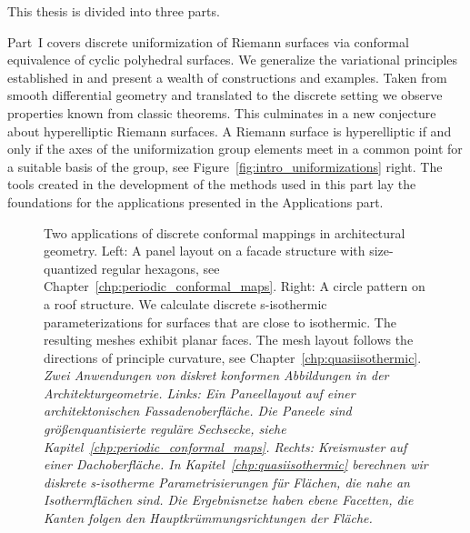 \documentclass[Thesis.tex]{subfiles}
\begin{document}
This thesis is divided into three parts. 

Part~I covers discrete uniformization of Riemann surfaces via conformal equivalence of cyclic polyhedral surfaces.
We generalize the variational principles established in \cite{Bobenko2010} and present a wealth of constructions and examples. 
Taken from smooth differential geometry and translated to the discrete setting we observe properties known from classic theorems. 
This culminates in a new conjecture about hyperelliptic Riemann surfaces. 
A Riemann surface is hyperelliptic if and only if the axes of the uniformization group elements meet in a common point for a suitable basis of the group, see Figure~\ref{fig:intro_uniformizations} right.
The tools created in the development of the methods used in this part lay the foundations for the applications presented in the Applications part.

\begin{figure}
\centering
{}
\caption{
Two applications of discrete conformal mappings in architectural geometry. 
Left: A panel layout on a facade structure with size-quantized regular hexagons, see Chapter~\ref{chp:periodic_conformal_maps}.
Right: A circle pattern on a roof structure. 
We calculate discrete s-isothermic parameterizations for surfaces that are close to isothermic.
The resulting meshes exhibit planar faces. 
The mesh layout follows the directions of principle curvature, see Chapter~\ref{chp:quasiisothermic}.\\
\it Zwei Anwendungen von diskret konformen Abbildungen in der Architekturgeometrie. 
Links: Ein Paneellayout auf einer architektonischen Fassadenoberfl\"{a}che. 
Die Paneele sind gr\"{o}{\ss}enquantisierte regul\"{a}re Sechsecke, siehe Kapitel~\ref{chp:periodic_conformal_maps}.
Rechts: Kreismuster auf einer Dachoberfl\"{a}che.
In Kapitel~\ref{chp:quasiisothermic} berechnen wir diskrete s-isotherme Parametrisierungen f\"{u}r Fl\"{a}chen, die nahe an Isothermfl\"{a}chen sind.
Die Ergebnisnetze haben ebene Facetten, die Kanten folgen den Hauptkr\"{u}mmungsrichtungen der Fl\"{a}che. 
}
\label{fig:intro_applications} 
\end{figure}
\end{document}
